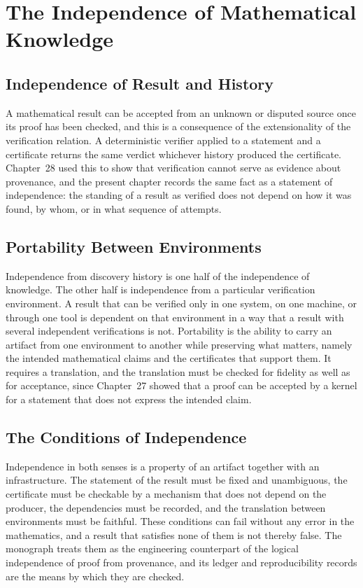 \documentclass[11pt,letterpaper]{report}
\theoremstyle{plain}
\theoremstyle{definition}
\theoremstyle{remark}
\begin{document}
\chapter{The Independence of Mathematical Knowledge}

\section{Independence of Result and History}

A mathematical result can be accepted from an unknown or disputed source once its proof has been checked, and this is a consequence of the extensionality of the verification relation. A deterministic verifier applied to a statement and a certificate returns the same verdict whichever history produced the certificate. Chapter~28 used this to show that verification cannot serve as evidence about provenance, and the present chapter records the same fact as a statement of independence: the standing of a result as verified does not depend on how it was found, by whom, or in what sequence of attempts.

\section{Portability Between Environments}

Independence from discovery history is one half of the independence of knowledge. The other half is independence from a particular verification environment. A result that can be verified only in one system, on one machine, or through one tool is dependent on that environment in a way that a result with several independent verifications is not. Portability is the ability to carry an artifact from one environment to another while preserving what matters, namely the intended mathematical claims and the certificates that support them. It requires a translation, and the translation must be checked for fidelity as well as for acceptance, since Chapter~27 showed that a proof can be accepted by a kernel for a statement that does not express the intended claim.

\section{The Conditions of Independence}

Independence in both senses is a property of an artifact together with an infrastructure. The statement of the result must be fixed and unambiguous, the certificate must be checkable by a mechanism that does not depend on the producer, the dependencies must be recorded, and the translation between environments must be faithful. These conditions can fail without any error in the mathematics, and a result that satisfies none of them is not thereby false. The monograph treats them as the engineering counterpart of the logical independence of proof from provenance, and its ledger and reproducibility records are the means by which they are checked.
\end{document}
